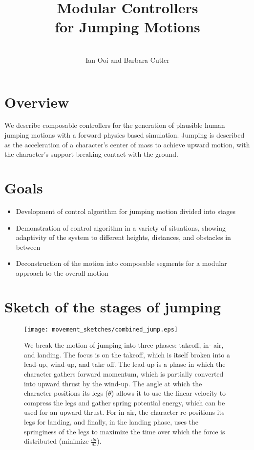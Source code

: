 \documentclass[landscape,26pt]{sciposter}
\title{ Modular Controllers \\for Jumping Motions}
\author{\ \\ Ian Ooi and Barbara Cutler}
\institute{Department of Computer Science\\
           Rensselaer Polytechnic Institute\\}
\begin{document}


\maketitle

\begin{minipage}[t]{10.5in}
	\section*{Overview}
		We describe composable controllers for the generation of plausible human jumping motions with a forward physics based simulation.  Jumping is described as the acceleration of a character's center of mass to achieve upward motion, with the character's support breaking contact with the ground.  

		\vspace{.3in}
	\section*{Goals}
		\begin{itemize}
			\item Development of control algorithm for jumping motion divided into stages 
			\item Demonstration of control algorithm in a variety of situations, showing adaptivity of the system to different heights, distances, and obstacles in between
			\item Deconstruction of the motion into composable segments for a modular approach to the overall motion
		\end{itemize}

		\vspace{.3in}

		\section*{Sketch of the stages of jumping}
			\begin{figure}
				\centering
				\texttt{[image: movement\_sketches/combined\_jump.eps]}
				\caption{
			We break the motion of jumping into three phases: takeoff, in-	air, and landing.  The focus is on the takeoff, which is itself broken into a lead-up, wind-up, and take off.  The lead-up is a phase in which the character gathers forward momentum, which is partially converted into upward thrust by the wind-up.  The angle at which the character positions its legs ($\theta$) allows it to use the linear velocity to compress the legs and gather spring potential energy, which can be used for an upward thrust.  For in-air, the character re-positions its legs for landing, and finally, in the landing phase, uses the springiness of the legs to maximize the time over which the force is distributed (minimize $\frac{da}{dt}$).}
			\end{figure}
			
	\end{minipage}
\end{document}
